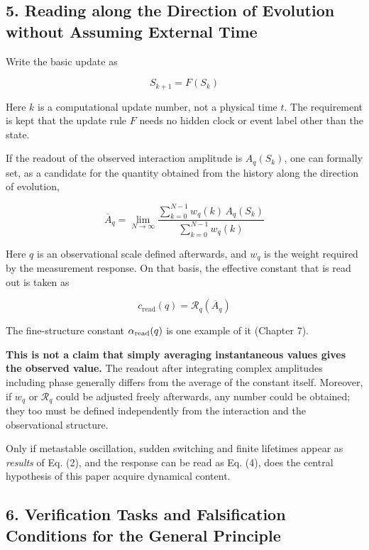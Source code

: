 \documentclass[
  a4paper,
]{article}
\begin{document}
\subsection{5. Reading along the Direction of Evolution without Assuming
External
Time}\label{reading-along-the-direction-of-evolution-without-assuming-external-time}

Write the basic update as

\[
S_{k+1}=F(S_k)
\tag{2}
\]

Here \(k\) is a computational update number, not a physical time \(t\).
The requirement is kept that the update rule \(F\) needs no hidden clock
or event label other than the state.

If the readout of the observed interaction amplitude is \(A_q(S_k)\),
one can formally set, as a candidate for the quantity obtained from the
history along the direction of evolution,

\[
\overline{A}_q
=\lim_{N\to\infty}
\frac{\sum_{k=0}^{N-1}w_q(k)\,A_q(S_k)}
{\sum_{k=0}^{N-1}w_q(k)}
\tag{3}
\]

Here \(q\) is an observational scale defined afterwards, and \(w_q\) is
the weight required by the measurement response. On that basis, the
effective constant that is read out is taken as

\[
c_{\mathrm{read}}(q)=\mathcal R_q(\overline A_q)
\tag{4}
\]

The fine-structure constant \(\alpha_{\rm read}(q)\) is one example of
it (Chapter 7).

\textbf{This is not a claim that simply averaging instantaneous values
gives the observed value.} The readout after integrating complex
amplitudes including phase generally differs from the average of the
constant itself. Moreover, if \(w_q\) or \(\mathcal R_q\) could be
adjusted freely afterwards, any number could be obtained; they too must
be defined independently from the interaction and the observational
structure.

Only if metastable oscillation, sudden switching and finite lifetimes
appear as \emph{results} of Eq. (2), and the response can be read as Eq.
(4), does the central hypothesis of this paper acquire dynamical
content.

\subsection{6. Verification Tasks and Falsification Conditions for the
General
Principle}\label{verification-tasks-and-falsification-conditions-for-the-general-principle}
\end{document}
